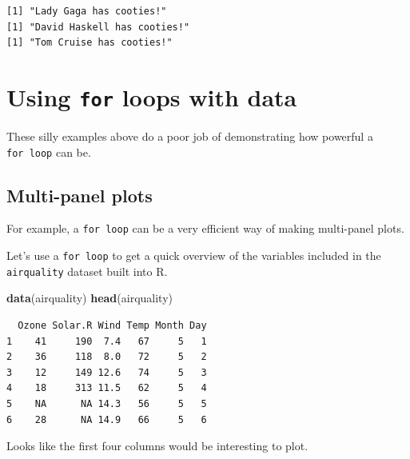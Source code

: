 \documentclass[
]{book}
\newenvironment{Shaded}{\begin{snugshade}}{\end{snugshade}}
\newcommand{\KeywordTok}[1]{\textcolor[rgb]{0.13,0.29,0.53}{\textbf{#1}}}
\newcommand{\NormalTok}[1]{#1}
\begin{document}
\begin{verbatim}
[1] "Lady Gaga has cooties!"
[1] "David Haskell has cooties!"
[1] "Tom Cruise has cooties!"
\end{verbatim}

\hypertarget{using-for-loops-with-data}{%
\section*{\texorpdfstring{Using \texttt{for} loops with data}{Using for loops with data}}\label{using-for-loops-with-data}}

These silly examples above do a poor job of demonstrating how powerful a \texttt{for\ loop} can be.

\hypertarget{multi-panel-plots}{%
\subsection*{Multi-panel plots}\label{multi-panel-plots}}

For example, a \texttt{for\ loop} can be a very efficient way of making multi-panel plots.

Let's use a \texttt{for\ loop} to get a quick overview of the variables included in the \texttt{airquality} dataset built into R.

\begin{Shaded}
\begin{Highlighting}[]
\KeywordTok{data}\NormalTok{(airquality)}
\KeywordTok{head}\NormalTok{(airquality)}
\end{Highlighting}
\end{Shaded}

\begin{verbatim}
  Ozone Solar.R Wind Temp Month Day
1    41     190  7.4   67     5   1
2    36     118  8.0   72     5   2
3    12     149 12.6   74     5   3
4    18     313 11.5   62     5   4
5    NA      NA 14.3   56     5   5
6    28      NA 14.9   66     5   6
\end{verbatim}

Looks like the first four columns would be interesting to plot.
\end{document}
